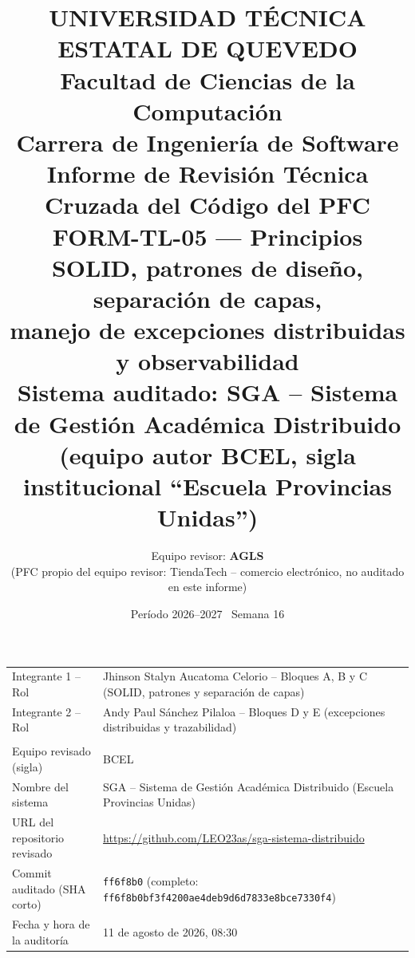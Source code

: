 \documentclass[11pt,a4paper]{article}
\title{
    \vspace{-1.5cm}
    {\small UNIVERSIDAD T\'ECNICA ESTATAL DE QUEVEDO\\Facultad de Ciencias de la Computaci\'on\\Carrera de Ingenier\'ia de Software}\\[0.6cm]
    \textbf{\Large Informe de Revisi\'on T\'ecnica Cruzada del C\'odigo del PFC}\\[0.2cm]
    \large FORM-TL-05 --- Principios SOLID, patrones de dise\~no, separaci\'on de capas,\\
    manejo de excepciones distribuidas y observabilidad\\[0.3cm]
    \normalsize Sistema auditado: \textbf{SGA -- Sistema de Gesti\'on Acad\'emica Distribuido}\\
    (equipo autor \textbf{BCEL}, sigla institucional ``Escuela Provincias Unidas'')
}
\author{Equipo revisor: \textbf{AGLS}\\ \small (PFC propio del equipo revisor: TiendaTech -- comercio electr\'onico, no auditado en este informe)}
\date{Per\'iodo 2026--2027 \textperiodcentered\ Semana 16}
\begin{document}
    \maketitle
    \thispagestyle{empty}

    \begin{center}
        \renewcommand{\arraystretch}{1.3}
        \begin{tabularx}{\textwidth}{@{}>{\raggedright\arraybackslash}p{4.2cm}X@{}}
\toprule
\multicolumn{2}{l}{\textbf{Datos del equipo REVISOR (AGLS)}}\\
\midrule
Integrante 1 -- Rol & Jhinson Stalyn Aucatoma Celorio -- Bloques A, B y C (SOLID, patrones y separaci\'on de capas) \\
Integrante 2 -- Rol & Andy Paul S\'anchez Pilaloa -- Bloques D y E (excepciones distribuidas y trazabilidad) \\
\midrule
\multicolumn{2}{l}{\textbf{Datos del PFC REVISADO (BCEL)}}\\
\midrule
Equipo revisado (sigla) & BCEL \\
Nombre del sistema & SGA -- Sistema de Gesti\'on Acad\'emica Distribuido (Escuela Provincias Unidas) \\
URL del repositorio revisado & \small\url{https://github.com/LEO23as/sga-sistema-distribuido} \\
Commit auditado (SHA corto) & \texttt{\small ff6f8b0} \small (completo: \texttt{ff6f8b0bf3f4200ae4deb9d6d7833e8bce7330f4}) \\
Fecha y hora de la auditor\'ia & 11 de agosto de 2026, 08:30 \\
\bottomrule
        \end{tabularx}
    \end{center}
\end{document}
